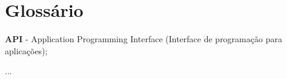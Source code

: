 \section{Glossário}

\noindent {}


\textbf{API} - Application Programming Interface (Interface de programação para aplicações);

...
   
